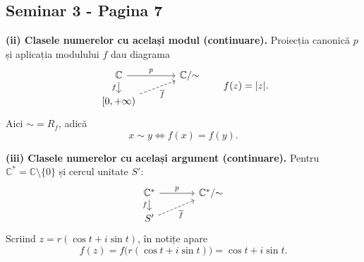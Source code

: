 
\subsection*{Seminar 3 - Pagina 7}
\begingroup
\setlength{\abovedisplayskip}{5pt}
\setlength{\belowdisplayskip}{5pt}
\setlength{\abovedisplayshortskip}{3pt}
\setlength{\belowdisplayshortskip}{3pt}

\noindent\textbf{(ii) Clasele numerelor cu același modul (continuare).}
Proiecția canonică $p$ și aplicația modulului $f$ dau diagrama
\[
\begin{tikzcd}[column sep=large,row sep=small]
 \mathbb C\arrow[r,"p"]\arrow[d,"f"'] & \mathbb C/{\sim}\\
 {[0,+\infty)}\arrow[ur,dashed,"\overline f"'] &
\end{tikzcd}
\qquad f(z)=|z|.
\]
Aici $\sim=R_f$, adică
\[
 x\sim y\iff f(x)=f(y).
\]

\noindent\textbf{(iii) Clasele numerelor cu același argument (continuare).}
Pentru $\mathbb C^*=\mathbb C\setminus\{0\}$ și cercul unitate $S'$:
\[
\begin{tikzcd}[column sep=large,row sep=small]
 \mathbb C^*\arrow[r,"p"]\arrow[d,"f"'] & \mathbb C^*/{\sim}\\
 S'\arrow[ur,dashed,"\overline f"'] &
\end{tikzcd}
\]
Scriind $z=r(\cos t+i\sin t)$, în notițe apare
\[
 f(z)=f\bigl(r(\cos t+i\sin t)\bigr)=\cos t+i\sin t.
\]

